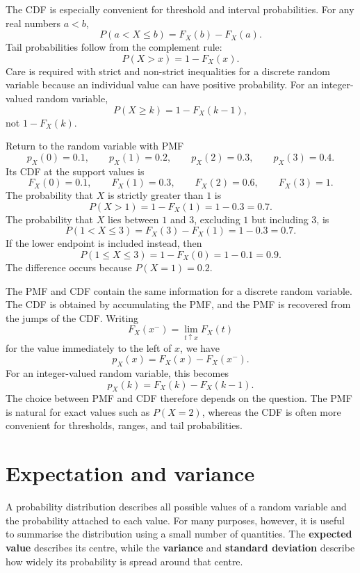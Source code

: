The CDF is especially convenient for threshold and interval probabilities. For any real numbers $a<b$,
\[
P(a<X\leq b)=F_X(b)-F_X(a).
\]
Tail probabilities follow from the complement rule:
\[
P(X>x)=1-F_X(x).
\]
Care is required with strict and non-strict inequalities for a discrete random variable because an individual value can have positive probability. For an integer-valued random variable,
\[
P(X\geq k)=1-F_X(k-1),
\]
not $1-F_X(k)$.

\begin{example}\par
Return to the random variable with PMF
\[
p_X(0)=0.1,\qquad p_X(1)=0.2,\qquad p_X(2)=0.3,\qquad p_X(3)=0.4.
\]
Its CDF at the support values is
\[
F_X(0)=0.1,\qquad F_X(1)=0.3,\qquad F_X(2)=0.6,\qquad F_X(3)=1.
\]
The probability that $X$ is strictly greater than $1$ is
\[
P(X>1)=1-F_X(1)=1-0.3=0.7.
\]
The probability that $X$ lies between $1$ and $3$, excluding $1$ but including $3$, is
\[
P(1<X\leq3)=F_X(3)-F_X(1)=1-0.3=0.7.
\]
If the lower endpoint is included instead, then
\[
P(1\leq X\leq3)=1-F_X(0)=1-0.1=0.9.
\]
The difference occurs because $P(X=1)=0.2$.
\end{example}

The PMF and CDF contain the same information for a discrete random variable. The CDF is obtained by accumulating the PMF, and the PMF is recovered from the jumps of the CDF. Writing
\[
F_X(x^-)=\lim_{t\uparrow x}F_X(t)
\]
for the value immediately to the left of $x$, we have
\[
p_X(x)=F_X(x)-F_X(x^-).
\]
For an integer-valued random variable, this becomes
\[
p_X(k)=F_X(k)-F_X(k-1).
\]
The choice between PMF and CDF therefore depends on the question. The PMF is natural for exact values such as $P(X=2)$, whereas the CDF is often more convenient for thresholds, ranges, and tail probabilities.

\section{Expectation and variance}
\label{sec:expectation-variance}

A probability distribution describes all possible values of a random variable and the probability attached to each value. For many purposes, however, it is useful to summarise the distribution using a small number of quantities. The \textbf{expected value} describes its centre, while the \textbf{variance} and \textbf{standard deviation} describe how widely its probability is spread around that centre.

